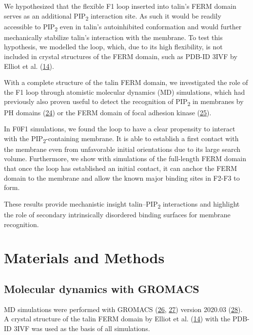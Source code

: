 \documentclass[
  twocolumn]{biophys-new-mod}
\begin{document}
We hypothesized that the flexible F1 loop inserted into talin's FERM
domain serves as an additional PIP\textsubscript{2} interaction site. As
such it would be readily accessible to PIP\textsubscript{2} even in
talin's autoinhibited conformation and would further mechanically
stabilize talin's interaction with the membrane. To test this
hypothesis, we modelled the loop, which, due to its high flexibility, is
not included in crystal structures of the FERM domain, such as PDB-ID
3IVF by Elliot et al.
(\protect\hyperlink{ref-elliottStructureTalinHead2010}{14}).

With a complete structure of the talin FERM domain, we investigated the
role of the F1 loop through atomistic molecular dynamics (MD)
simulations, which had previously also proven useful to detect the
recognition of PIP\textsubscript{2} in membranes by PH domains
(\protect\hyperlink{ref-buyanMultiscaleSimulationsSuggest2016}{24}) or
the FERM domain of focal adhesion kinase
(\protect\hyperlink{ref-zhouMechanismFocalAdhesion2015}{25}).

In F0F1 simulations, we found the loop to have a clear propensity to
interact with the PIP\textsubscript{2}-containing membrane. It is able
to establish a first contact with the membrane even from unfavorable
initial orientations due to its large search volume. Furthermore, we
show with simulations of the full-length FERM domain that once the loop
has established an initial contact, it can anchor the FERM domain to the
membrane and allow the known major binding sites in F2-F3 to form.

These results provide mechanistic insight talin--PIP\textsubscript{2}
interactions and highlight the role of secondary intrinsically
disordered binding surfaces for membrane recognition.

\hypertarget{materials-and-methods}{%
\section{Materials and Methods}\label{materials-and-methods}}

\hypertarget{molecular-dynamics-with-gromacs}{%
\subsection{Molecular dynamics with
GROMACS}\label{molecular-dynamics-with-gromacs}}

MD simulations were performed with GROMACS
(\protect\hyperlink{ref-berendsenGROMACSMessagepassingParallel1995}{26},
\protect\hyperlink{ref-abrahamGROMACSHighPerformance2015}{27}) version
2020.03 (\protect\hyperlink{ref-lindahlGROMACS2020Source2020}{28}). A
crystal structure of the talin FERM domain by Elliot et al.
(\protect\hyperlink{ref-elliottStructureTalinHead2010}{14}) with the
PDB-ID 3IVF was used as the basis of all simulations.
\end{document}
